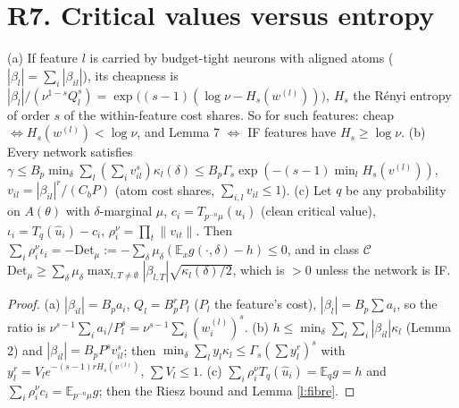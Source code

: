 \documentclass[11pt]{article}
\theoremstyle{remark}\newtheorem{remark}[theorem]{Remark}
\newcommand{\E}{\mathbb E}\newcommand{\R}{\mathbb R}\newcommand{\Re}{\operatorname{Re}}
\begin{document}
\section{R7. Critical values versus entropy}
\begin{proposition}\label{p:renyi}
(a) If feature $l$ is carried by budget-tight neurons with aligned atoms ($|\beta_l|=\sum_i|\beta_{il}|$), its cheapness is
$|\beta_l|/(\nu^{1-s}Q_l^s)=\exp\big((s-1)(\log\nu-H_s(w^{(l)}))\big)$, $H_s$ the Rényi entropy of order $s$ of the within-feature cost shares.
So for such features: cheap $\iff H_s(w^{(l)})<\log\nu$, and Lemma 7 $\iff$ IF features have $H_s\ge\log\nu$.
(b) Every network satisfies $\gamma\le B_p\min_\delta\sum_l(\sum_iv_{il}^s)\kappa_l(\delta)\le B_p\Gamma_s\exp(-(s-1)\min_lH_s(v^{(l)}))$,
$v_{il}=|\beta_{il}|^r/(C_bP)$ (atom cost shares, $\sum_{i,l}v_{il}\le1$).
(c) Let $q$ be any probability on $A(\theta)$ with $\delta$-marginal $\mu$, $c_i=T_{p^{-n}\mu}(\hat u_i)$ (clean critical value), $\iota_i=T_q(\hat u_i)-c_i$, $\rho_i^\nu=\prod_t\|v_{it}\|$. Then
$\sum_i\rho_i^\nu\iota_i=-\mathrm{Det}_\mu:=-\sum_\delta\mu_\delta(\E_xg(\cdot,\delta)-h)\le0$, and in class $\mathcal C$
$\mathrm{Det}_\mu\ge\sum_\delta\mu_\delta\max_{l,T\ne\emptyset}|\beta_{l,T}|\sqrt{\kappa_l(\delta)/2}$, which is $>0$ unless the network is IF.
\end{proposition}
\begin{proof}
(a) $|\beta_{il}|=B_pa_i$, $Q_l=B_p^rP_l$ ($P_l$ the feature's cost), $|\beta_l|=B_p\sum a_i$, so the ratio is $\nu^{s-1}\sum_ia_i/P_l^s=\nu^{s-1}\sum_i(w^{(l)}_i)^s$.
(b) $h\le\min_\delta\sum_l\sum_i|\beta_{il}|\kappa_l$ (Lemma 2) and $|\beta_{il}|=B_pP^sv_{il}^s$; then $\min_\delta\sum_ly_l\kappa_l\le\Gamma_s(\sum y_l^r)^s$
with $y_l^r=V_le^{-(s-1)rH_s(v^{(l)})}$, $\sum V_l\le1$.
(c) $\sum_i\rho_i^\nu T_q(\hat u_i)=\E_qg=h$ and $\sum_i\rho_i^\nu c_i=\E_{p^{-n}\mu}g$; then the Riesz bound and Lemma \ref{l:fibre}.
\end{proof}
\end{document}
